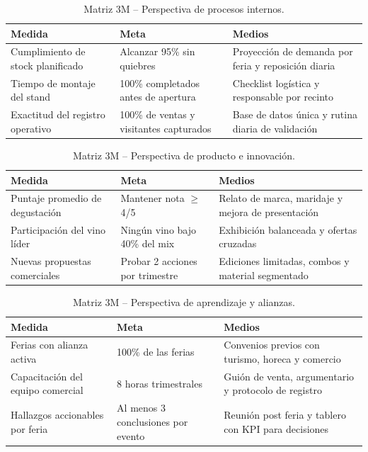 \documentclass[10pt,a4paper]{article}
\begin{document}
\begin{table}[H]
\centering
\caption{Matriz 3M -- Perspectiva de procesos internos.}
\label{tab:3m_proc}
\small
\begin{tabular}{p{4cm} p{4.5cm} p{5.3cm}}
\toprule
\textbf{Medida} & \textbf{Meta} & \textbf{Medios} \\
\midrule
Cumplimiento de stock planificado & Alcanzar 95\% sin quiebres & Proyecci\'on de demanda por feria y reposici\'on diaria \\
Tiempo de montaje del stand & 100\% completados antes de apertura & Checklist log\'istica y responsable por recinto \\
Exactitud del registro operativo & 100\% de ventas y visitantes capturados & Base de datos \'unica y rutina diaria de validaci\'on \\
\bottomrule
\end{tabular}
\end{table}

\begin{table}[H]
\centering
\caption{Matriz 3M -- Perspectiva de producto e innovaci\'on.}
\label{tab:3m_prod}
\small
\begin{tabular}{p{4cm} p{4.5cm} p{5.3cm}}
\toprule
\textbf{Medida} & \textbf{Meta} & \textbf{Medios} \\
\midrule
Puntaje promedio de degustaci\'on & Mantener nota $\geq$ 4/5 & Relato de marca, maridaje y mejora de presentaci\'on \\
Participaci\'on del vino l\'ider & Ning\'un vino bajo 40\% del mix & Exhibici\'on balanceada y ofertas cruzadas \\
Nuevas propuestas comerciales & Probar 2 acciones por trimestre & Ediciones limitadas, combos y material segmentado \\
\bottomrule
\end{tabular}
\end{table}

\begin{table}[H]
\centering
\caption{Matriz 3M -- Perspectiva de aprendizaje y alianzas.}
\label{tab:3m_apr}
\small
\begin{tabular}{p{4cm} p{4.5cm} p{5.3cm}}
\toprule
\textbf{Medida} & \textbf{Meta} & \textbf{Medios} \\
\midrule
Ferias con alianza activa & 100\% de las ferias & Convenios previos con turismo, horeca y comercio \\
Capacitaci\'on del equipo comercial & 8 horas trimestrales & Gui\'on de venta, argumentario y protocolo de registro \\
Hallazgos accionables por feria & Al menos 3 conclusiones por evento & Reuni\'on post feria y tablero con KPI para decisiones \\
\bottomrule
\end{tabular}
\end{table}
\end{document}
